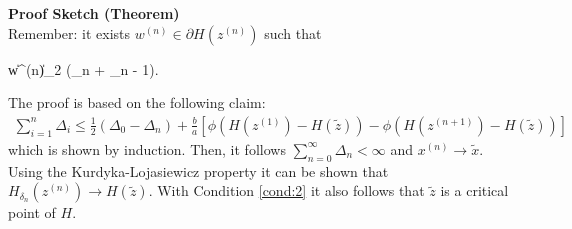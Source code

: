 \documentclass[onecolumn,final,a4paper,13pt,reqno]{siamart}
\begin{document}
	\textbf{Proof Sketch (Theorem)}\\
	Remember: it exists $w^{(n)} \in \partial H(z^{(n)})$ such that
	\begin{Lalign}
		\|w^{(n)}\|_2 \leq {}(\Delta_n + \Delta_{n - 1})\label{cond:2}.
	\end{Lalign}
	The proof is based on the following claim:
	\begin{align}
		\sum_{i = 1}^n \Delta_i \leq \frac{1}{2}(\Delta_0 - \Delta_n) + \frac{b}{a}\left[\phi(H(z^{(1)}) - H(\tilde{z})) - \phi(H(z^{(n + 1)}) - H(\tilde{z}))\right]
	\end{align}
	which is shown by induction. Then, it follows $\sum_{n = 0}^\infty \Delta_n < \infty$ and $x^{(n)} \rightarrow \tilde{x}$. Using the Kurdyka-Lojasiewicz property it can be shown that $H_{\delta_n}(z^{(n)}) \rightarrow H(\tilde{z})$. With Condition \eqref{cond:2} it also follows that $\tilde{z}$ is a critical point of $H$.
	
\end{document}
